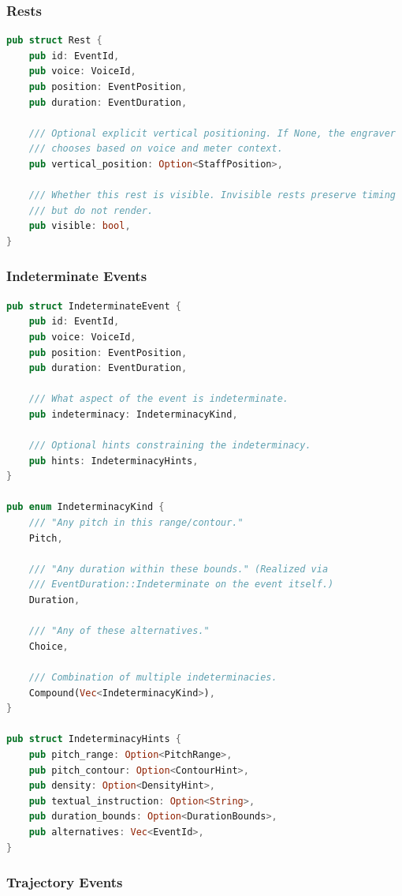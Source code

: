 \documentclass[11pt,letterpaper]{report}
\begin{document}
\subsubsection{Rests}

\begin{lstlisting}[language=Rust]
pub struct Rest {
    pub id: EventId,
    pub voice: VoiceId,
    pub position: EventPosition,
    pub duration: EventDuration,

    /// Optional explicit vertical positioning. If None, the engraver
    /// chooses based on voice and meter context.
    pub vertical_position: Option<StaffPosition>,

    /// Whether this rest is visible. Invisible rests preserve timing
    /// but do not render.
    pub visible: bool,
}
\end{lstlisting}

\subsubsection{Indeterminate Events}

\begin{lstlisting}[language=Rust]
pub struct IndeterminateEvent {
    pub id: EventId,
    pub voice: VoiceId,
    pub position: EventPosition,
    pub duration: EventDuration,

    /// What aspect of the event is indeterminate.
    pub indeterminacy: IndeterminacyKind,

    /// Optional hints constraining the indeterminacy.
    pub hints: IndeterminacyHints,
}

pub enum IndeterminacyKind {
    /// "Any pitch in this range/contour."
    Pitch,

    /// "Any duration within these bounds." (Realized via
    /// EventDuration::Indeterminate on the event itself.)
    Duration,

    /// "Any of these alternatives."
    Choice,

    /// Combination of multiple indeterminacies.
    Compound(Vec<IndeterminacyKind>),
}

pub struct IndeterminacyHints {
    pub pitch_range: Option<PitchRange>,
    pub pitch_contour: Option<ContourHint>,
    pub density: Option<DensityHint>,
    pub textual_instruction: Option<String>,
    pub duration_bounds: Option<DurationBounds>,
    pub alternatives: Vec<EventId>,
}
\end{lstlisting}

\subsubsection{Trajectory Events}
\end{document}
